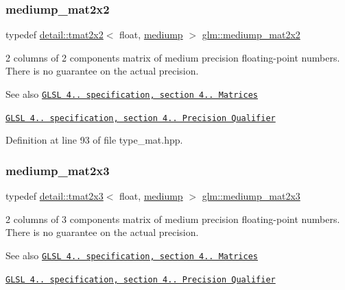 \subsubsection{\texorpdfstring{mediump\+\_\+mat2x2}{mediump\_mat2x2}}
{\footnotesize\ttfamily typedef \hyperlink{structglm_1_1detail_1_1tmat2x2}{detail\+::tmat2x2}$<$ float, \hyperlink{namespaceglm_a0f04f086094c747d227af4425893f545a6416f3ea0c9025fb21ed50c4d6620482}{mediump} $>$ \hyperlink{group__core__precision_ga867b486aea2d228a1e1a134af73b2c4b}{glm\+::mediump\+\_\+mat2x2}}

2 columns of 2 components matrix of medium precision floating-\/point numbers. There is no guarantee on the actual precision.

\begin{DoxySeeAlso}{See also}
\href{http://www.opengl.org/registry/doc/GLSLangSpec.4.20.8.pdf}{\tt G\+L\+SL 4.. specification, section 4.. Matrices} 

\href{http://www.opengl.org/registry/doc/GLSLangSpec.4.20.8.pdf}{\tt G\+L\+SL 4.. specification, section 4.. Precision Qualifier} 
\end{DoxySeeAlso}


Definition at line 93 of file type\+\_\+mat.\+hpp.

\mbox{\label{group__core__precision_gad4e099c0dfa8f35ce9c0ddc8605428cf}} 
\subsubsection{\texorpdfstring{mediump\+\_\+mat2x3}{mediump\_mat2x3}}
{\footnotesize\ttfamily typedef \hyperlink{structglm_1_1detail_1_1tmat2x3}{detail\+::tmat2x3}$<$ float, \hyperlink{namespaceglm_a0f04f086094c747d227af4425893f545a6416f3ea0c9025fb21ed50c4d6620482}{mediump} $>$ \hyperlink{group__core__precision_gad4e099c0dfa8f35ce9c0ddc8605428cf}{glm\+::mediump\+\_\+mat2x3}}

2 columns of 3 components matrix of medium precision floating-\/point numbers. There is no guarantee on the actual precision.

\begin{DoxySeeAlso}{See also}
\href{http://www.opengl.org/registry/doc/GLSLangSpec.4.20.8.pdf}{\tt G\+L\+SL 4.. specification, section 4.. Matrices} 

\href{http://www.opengl.org/registry/doc/GLSLangSpec.4.20.8.pdf}{\tt G\+L\+SL 4.. specification, section 4.. Precision Qualifier} 
\end{DoxySeeAlso}


